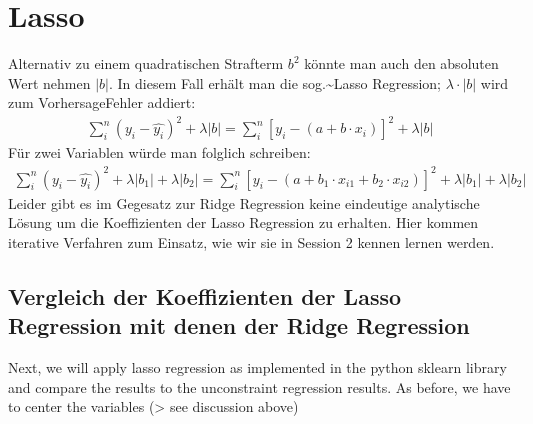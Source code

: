 \documentclass[letterpaper,10pt,english]{jupyterBook}
\begin{document}
\section{Lasso}
\label{\detokenize{Regression_Techniques:lasso}}
\sphinxAtStartPar
Alternativ zu einem quadratischen Strafterm \(b^2\) könnte man auch den absoluten Wert nehmen \(|b|\). In diesem Fall erhält man die sog.\textasciitilde{}Lasso Regression; \(\lambda\cdot |b|\) wird zum Vorhersage\sphinxhyphen{}Fehler addiert:
\begin{equation*}
\begin{split}\sum_i^{n}(y_i - \hat{y_i})^2 + \lambda |b|= \sum_i^{n}[y_i - (a + b\cdot x_i)]^{2}+ \lambda |b|\end{split}
\end{equation*}
\sphinxAtStartPar
Für zwei Variablen würde man folglich schreiben:
\begin{equation*}
\begin{split}\sum_i^{n}(y_i - \hat{y_i})^2 + \lambda |b_1| + \lambda |b_2|= \sum_i^{n}[y_i - (a + b_1\cdot x_{i1} + b_2\cdot x_{i2})]^{2}+ \lambda |b_1| + \lambda |b_2|\end{split}
\end{equation*}
\sphinxAtStartPar
Leider gibt es im Gegesatz zur Ridge Regression keine eindeutige analytische Lösung um die Koeffizienten der Lasso Regression zu erhalten. Hier kommen iterative Verfahren zum Einsatz, wie wir sie in Session 2 kennen lernen werden.


\subsection{Vergleich der Koeffizienten der Lasso Regression mit denen der Ridge Regression}
\label{\detokenize{Regression_Techniques:vergleich-der-koeffizienten-der-lasso-regression-mit-denen-der-ridge-regression}}
\sphinxAtStartPar
Next, we will apply lasso regression as implemented in the python sklearn library and compare the results to the unconstraint regression results.
As before, we have to center the variables (\sphinxhyphen{}> see discussion above)
\end{document}
